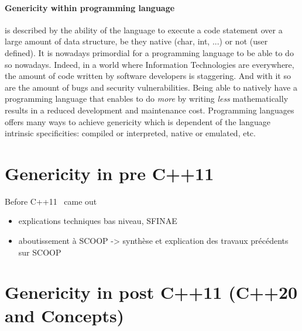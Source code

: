 \paragraph{Genericity within programming language} is described by the ability of the language to execute a code
statement over a large amount of data structure, be they native (char, int, ...) or not (user defined). It is nowadays
primordial for a programming language to be able to do so nowadays. Indeed, in a world where Information Technologies
are everywhere, the amount of code written by software developers is staggering. And with it so are the amount of bugs
and security vulnerabilities. Being able to natively have a programming language that enables to do \emph{more} by
writing \emph{less} mathematically results in a reduced development and maintenance cost. Programming languages offers
many ways to achieve genericity which is dependent of the language intrinsic specificities: compiled or interpreted,
native or emulated, etc.



\section{Genericity in pre C++11}

Before C++11~\parencite{iso.2011.cpp} came out


\begin{itemize}
  \item explications techniques bas niveau, SFINAE
  \item aboutissement à SCOOP -> synthèse et explication des travaux précédents sur SCOOP
\end{itemize}



\section{Genericity in post C++11 (C++20 and Concepts)}

